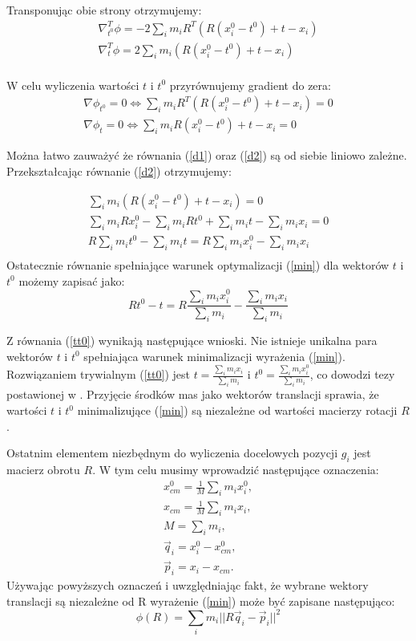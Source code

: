Transponując obie strony otrzymujemy:
\begin{eqnarray*}
\nabla_{t^0}^T \phi = -2 \sum_i m_i R^T (R (x^0_i - t^0) + t - x_i)\\
\nabla_{t}^T \phi = 2 \sum_i m_i (R (x^0_i - t^0) + t - x_i)\\
\end{eqnarray*}

W celu wyliczenia wartości $t$ i $t^0$ przyrównujemy gradient do zera:
\begin{eqnarray}
\label{d1}
\nabla \phi_{t^0} = 0 \Leftrightarrow \sum_i m_i R^T (R (x^0_i - t^0) + t - x_i) = 0\\
\label{d2}
\nabla \phi_{t} = 0 \Leftrightarrow \sum_i m_i R (x^0_i - t^0) + t - x_i = 0
\end{eqnarray}

Można łatwo zauważyć że równania (\ref{d1}) oraz (\ref{d2}) są od siebie liniowo
zależne. Przekształcając równanie (\ref{d2}) otrzymujemy:

\begin{eqnarray*}
\sum_i m_i (R (x^0_i - t^0) + t - x_i) = 0\\
\sum_i m_i R x^0_i - \sum_i m_i R t^0 + \sum_i m_i t - \sum_i m_i x_i = 0\\
R \sum_i m_i t^0 - \sum_i m_i t = R \sum_i m_i x^0_i - \sum_i m_i x_i\\
\end{eqnarray*}
Ostatecznie równanie spełniające warunek optymalizacji (\ref{min}) dla wektorów $t$
i $t^0$ możemy zapisać jako:
\begin{equation}
\label{tt0}
R t^0 - t = R \frac{\sum_i m_i x^0_i}{\sum_i m_i} - \frac{\sum_i m_i
	x_i}{\sum_i m_i}
\end{equation}

Z równania (\ref{tt0}) wynikają następujące wnioski. Nie istnieje unikalna para
wektorów
$t$ i $t^0$ spełniająca warunek minimalizacji wyrażenia (\ref{min}). Rozwiązaniem
trywialnym (\ref{tt0}) jest $t = \frac{\sum_i m_i x_i}{\sum_i m_i}$
i $t^0 = \frac{\sum_i m_i x^0_i}{\sum_i m_i}$,
	co dowodzi tezy postawionej w \cite{shape}. Przyjęcie środków mas jako
	wektorów translacji sprawia, że wartości $t$ i $t^0$ minimalizujące
	(\ref{min}) są niezależne od wartości macierzy rotacji $R$.

Ostatnim elementem niezbędnym do wyliczenia docelowych pozycji $g_i$ jest
macierz obrotu $R$. W tym celu musimy wprowadzić następujące oznaczenia:
\begin{eqnarray*}
x_{cm}^0 = \frac{1}{M} \sum_i m_i x_i^0,\\
x_{cm} = \frac{1}{M} \sum_i m_i x_i,\\
M = \sum_i m_i,\\
\vec{q}_i = x_i^0 - x_{cm}^0,\\
\vec{p}_i = x_i - x_{cm}.
\end{eqnarray*}
Używając powyższych oznaczeń i uwzględniając fakt, że wybrane wektory translacji
są niezależne od R wyrażenie (\ref{min}) może być zapisane następująco:
\begin{equation*}
\phi(R) = \sum_i m_i || R\vec{q}_i - \vec{p}_i||^2
\end{equation*}


